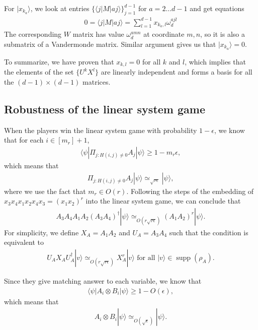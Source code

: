 \documentclass[11pt,letterpaper]{article}
\newcommand{\ket}[1]{|#1\rangle}
\newcommand{\bra}[1]{\langle#1|}
\newcommand{\x}{\otimes}
\DeclareMathOperator{\supp}{supp}
\newcommand{\1}{\mathbb{1}}
\newcommand{\appd}[1]{\simeq_{#1}}
\theoremstyle{definition}
\begin{document}
For $\ket{x_{k_a}}$, we look at entries $\{\bra{j}M\ket{aj}\}_{j=1}^{d-1}$ for $a = 2 \dots d-1$ and get equations
\begin{align}
	0 = \bra{j}M\ket{aj} = \sum_{l=1}^{d-1} x_{k_a, l} \omega_d^{ajl} 
\end{align}
The corresponding $W$ matrix has value $\omega_d^{amn}$ at coordinate $m,n$,
so it is also a submatrix of a Vandermonde matrix. Similar argument gives us that $\ket{x_{k_a}} = 0$.

To summarize, we have proven that $x_{k,l} = 0$ for all $k$ and $l$, which implies that the elements of the set
$\{ U^k X^l \}$ are linearly independent and forms a basis for all the $(d-1)\times(d-1)$ matrices.
\subsection{Robustness of the linear system game}
When the players win the linear system game with probability $1-\epsilon$,
we know that for each $i \in [m_r]+1$,
\begin{align}
\bra{\psi} \Pi_{j:H(i,j) \neq 0} A_j \ket{\psi} \geq 1- m_r \epsilon,
\end{align}
which means that 
\begin{align}
	\Pi_{j:H(i,j) \neq 0} A_j \ket{\psi} \appd{\sqrt{r\epsilon}} \ket{\psi},
\end{align}
where we use the fact that $m_r \in O(r)$.
Following the steps of the embedding of $x_3x_4x_1x_2x_4x_3 = (x_1x_2)^r$ into the linear system game,
we can conclude that 
\begin{align}
	A_3A_4 A_1A_2 (A_3A_4)^\dagger \ket{\psi}\appd{O(r\sqrt{r\epsilon})} (A_1A_2)^r \ket{\psi}.
\end{align}
For simplicity, we define $X_A = A_1A_2$ and $U_A=A_3A_4$ such that
the condition is equivalent to
\begin{align}
	\label{eq:ux_relation}
	U_AX_AU_A^\dagger \ket{v} \appd{O(r\sqrt{r\epsilon})} X_A^r \ket{v} \text{ for all } \ket{v} \in \supp(\rho_A).
\end{align}

Since they give matching answer to each variable, we know that 
\begin{align}
	\bra{\psi} A_i \x B_i \ket{\psi} \geq 1- O(\epsilon),
\end{align}
which means that
\begin{align}
	A_i \x B_i \ket{\psi} \appd{O(\sqrt{\epsilon})} \ket{\psi}.
\end{align}
\end{document}
